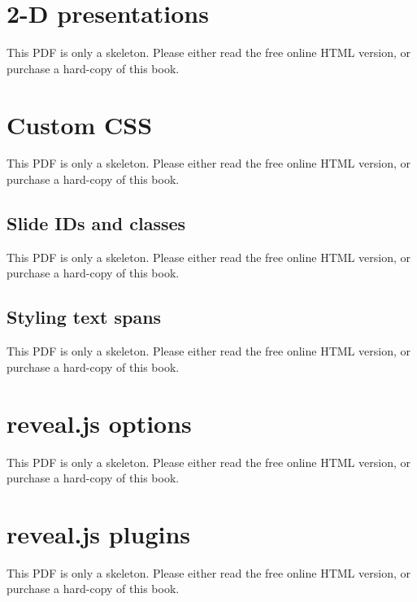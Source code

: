 \documentclass[
  11pt,
]{krantz}
\theoremstyle{definition}
\theoremstyle{definition}
\theoremstyle{definition}
\theoremstyle{definition}
\theoremstyle{remark}
\begin{document}
\section{2-D presentations}\label{d-presentations}

This PDF is only a skeleton. Please either read the free online HTML version, or purchase a hard-copy of this book.

\section{Custom CSS}\label{custom-css-1}

This PDF is only a skeleton. Please either read the free online HTML version, or purchase a hard-copy of this book.

\subsection{Slide IDs and classes}\label{slide-ids-and-classes}

This PDF is only a skeleton. Please either read the free online HTML version, or purchase a hard-copy of this book.

\subsection{Styling text spans}\label{styling-text-spans}

This PDF is only a skeleton. Please either read the free online HTML version, or purchase a hard-copy of this book.

\section{reveal.js options}\label{reveal.js-options}

This PDF is only a skeleton. Please either read the free online HTML version, or purchase a hard-copy of this book.

\section{reveal.js plugins}\label{reveal.js-plugins}

This PDF is only a skeleton. Please either read the free online HTML version, or purchase a hard-copy of this book.

\begin{table}\caption{\label{tab:revealjs-plugins} The currently supported reveal.js plugins.}\end{table}
\end{document}
